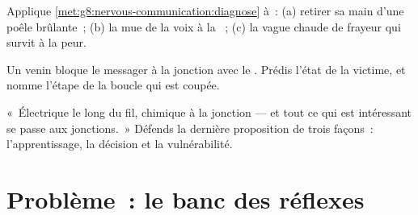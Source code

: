 \begin{exercise}[$\star\star$]\label{exo:g8:nervous-communication:10}
Applique \cref{met:g8:nervous-communication:diagnose} à~: (a)
retirer sa main d'une poêle brûlante~; (b) la mue de la voix à la
~; (c) la vague chaude de frayeur qui survit à la peur.
\end{exercise}

\begin{exercise}[$\star\star$]\label{exo:g8:nervous-communication:11}
Un venin bloque le messager à la jonction avec le . Prédis
l'état de la victime, et nomme l'étape de la boucle qui est coupée.
\end{exercise}

\begin{exercise}[$\star\star\star$]\label{exo:g8:nervous-communication:12}
«~Électrique le long du fil, chimique à la jonction --- et tout ce
qui est intéressant se passe aux jonctions.~» Défends la dernière
proposition de trois façons~: l'apprentissage, la décision et la
vulnérabilité.
\end{exercise}

\section{Problème~: le banc des réflexes}

